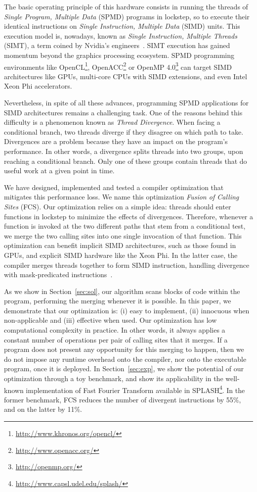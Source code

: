 \documentclass[times,10pt,twocolumn]{article}
\begin{document}
The basic operating principle of this
hardware consists in running the threads of {\em Single Program, Multiple
Data} (SPMD) programs in lockstep, so to execute their identical instructions on
{\em Single Instruction, Multiple Data} (SIMD) units.
This execution model is, nowadays, known as {\em Single Instruction, Multiple
Threads} (SIMT), a term coined by Nvidia's engineers~\cite{Nickolls10}.
SIMT execution has gained momentum beyond the graphics processing ecosystem.
SPMD programming environments like OpenCL\footnote{\url{http://www.khronos.org/opencl/}}, 
OpenACC\footnote{\url{http://www.openacc.org/}} or
OpenMP 4.0\footnote{\url{http://openmp.org/}} can target SIMD architectures like
GPUs, multi-core CPUs with SIMD extensions, and even Intel Xeon Phi accelerators.

Nevertheless, in spite of all these advances, programming SPMD applications for
SIMD architectures remains a challenging task.
One of the reasons behind this difficulty is a phenomenon known as
{\em Thread Divergence}.
When facing a conditional branch, two threads diverge if 
they disagree on which path to take.
Divergences are a problem because they have an impact on the program's
performance.
In other words, a divergence splits threads into two groups, upon reaching a
conditional branch.
Only one of these groups contain threads that do useful work at a given point
in time.

We have designed, implemented and tested a compiler optimization that
mitigates this performance loss.
We name this optimization {\em Fusion of Calling Sites} (FCS).
Our optimization relies on a simple idea: threads should enter functions
in lockstep to minimize the effects of divergences.
Therefore, whenever a function is invoked at the two different paths that stem
from a conditional test, we merge the two calling sites into one single
invocation of that function.
This optimization can benefit implicit SIMD architectures, such as those found in
GPUs, and explicit SIMD hardware like the Xeon Phi.
In the latter case, the compiler merges threads together to form SIMD instruction,
handling divergence with mask-predicated instructions~\cite{Karrenberg12}.

As we show in Section~\ref{sec:sol}, our algorithm scans blocks of code within
the program, performing the merging whenever it is possible.
In this paper, we demonstrate that our optimization is:
(i) easy to implement, (ii) innocuous when non-applicable and
(iii) effective when used.
Our optimization has low computational complexity in practice.
In other words, it always applies a constant number of
operations per pair of calling sites that it merges.
If a program does not present any opportunity for this merging to happen,
then we do not impose any runtime overhead onto the compiler, nor onto the
executable program, once it is deployed.
In Section~\ref{sec:exp}, we show the potential of our optimization through a
toy benchmark, and show its applicability in the well-known implementation of
Fast Fourier Transform available in SPLASH\footnote{\url{http://www.capsl.udel.edu/splash/}}.
In the former benchmark, FCS reduces the number of divergent instructions by
55\%, and on the latter by 11\%.
\end{document}
